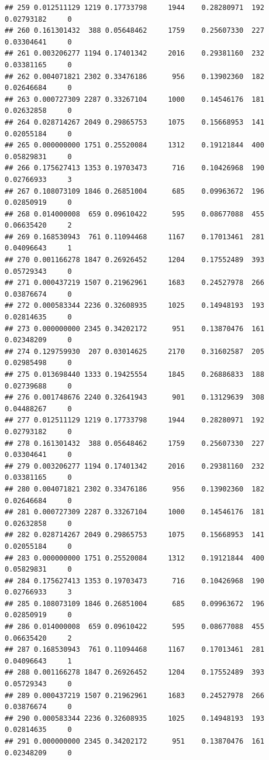 \documentclass[
]{article}
\begin{document}
\begin{verbatim}
## 259 0.012511129 1219 0.17733798     1944    0.28280971  192 0.02793182     0
## 260 0.161301432  388 0.05648462     1759    0.25607330  227 0.03304641     0
## 261 0.003206277 1194 0.17401342     2016    0.29381160  232 0.03381165     0
## 262 0.004071821 2302 0.33476186      956    0.13902360  182 0.02646684     0
## 263 0.000727309 2287 0.33267104     1000    0.14546176  181 0.02632858     0
## 264 0.028714267 2049 0.29865753     1075    0.15668953  141 0.02055184     0
## 265 0.000000000 1751 0.25520084     1312    0.19121844  400 0.05829831     0
## 266 0.175627413 1353 0.19703473      716    0.10426968  190 0.02766933     3
## 267 0.108073109 1846 0.26851004      685    0.09963672  196 0.02850919     0
## 268 0.014000008  659 0.09610422      595    0.08677088  455 0.06635420     2
## 269 0.168530943  761 0.11094468     1167    0.17013461  281 0.04096643     1
## 270 0.001166278 1847 0.26926452     1204    0.17552489  393 0.05729343     0
## 271 0.000437219 1507 0.21962961     1683    0.24527978  266 0.03876674     0
## 272 0.000583344 2236 0.32608935     1025    0.14948193  193 0.02814635     0
## 273 0.000000000 2345 0.34202172      951    0.13870476  161 0.02348209     0
## 274 0.129759930  207 0.03014625     2170    0.31602587  205 0.02985498     0
## 275 0.013698440 1333 0.19425554     1845    0.26886833  188 0.02739688     0
## 276 0.001748676 2240 0.32641943      901    0.13129639  308 0.04488267     0
## 277 0.012511129 1219 0.17733798     1944    0.28280971  192 0.02793182     0
## 278 0.161301432  388 0.05648462     1759    0.25607330  227 0.03304641     0
## 279 0.003206277 1194 0.17401342     2016    0.29381160  232 0.03381165     0
## 280 0.004071821 2302 0.33476186      956    0.13902360  182 0.02646684     0
## 281 0.000727309 2287 0.33267104     1000    0.14546176  181 0.02632858     0
## 282 0.028714267 2049 0.29865753     1075    0.15668953  141 0.02055184     0
## 283 0.000000000 1751 0.25520084     1312    0.19121844  400 0.05829831     0
## 284 0.175627413 1353 0.19703473      716    0.10426968  190 0.02766933     3
## 285 0.108073109 1846 0.26851004      685    0.09963672  196 0.02850919     0
## 286 0.014000008  659 0.09610422      595    0.08677088  455 0.06635420     2
## 287 0.168530943  761 0.11094468     1167    0.17013461  281 0.04096643     1
## 288 0.001166278 1847 0.26926452     1204    0.17552489  393 0.05729343     0
## 289 0.000437219 1507 0.21962961     1683    0.24527978  266 0.03876674     0
## 290 0.000583344 2236 0.32608935     1025    0.14948193  193 0.02814635     0
## 291 0.000000000 2345 0.34202172      951    0.13870476  161 0.02348209     0

\end{verbatim}
\end{document}
